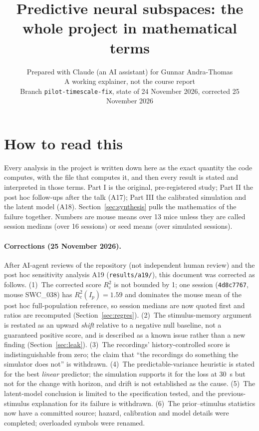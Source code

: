 \documentclass[11pt]{article}
\title{Predictive neural subspaces: the whole project in mathematical terms}
\author{Prepared with Claude (an AI assistant) for Gunnar Andra-Thomas \\ \small A working explainer, not the course report \\ \small Branch \texttt{pilot-timescale-fix}, state of 24 November 2026, corrected 25 November 2026}
\date{}
\newcommand{\Rc}{R^2_{\mathrm{c}}}
\begin{document}
\maketitle
\tableofcontents

\section*{How to read this}

Every analysis in the project is written down here as the exact quantity the code computes, with the file that
computes it, and then every result is stated and interpreted in those terms. Part I is the original, pre-registered
study; Part II the post hoc follow-ups after the talk (A17); Part III the calibrated simulation and the latent model
(A18). Section~\ref{sec:synthesis} pulls the mathematics of the failure together. Numbers are mouse means over 13
mice unless they are called session medians (over 16 sessions) or seed means (over simulated sessions).

\paragraph{Corrections (25 November 2026).} After AI-agent reviews of the repository (not independent human review)
and the post hoc sensitivity analysis A19 (\texttt{results/a19/}), this document was corrected as follows.
(1)~The corrected score $\Rc$ is not bounded by 1; one session (\texttt{4d8c7767}, mouse SWC\_038) has $\Rc(I_p) =
1.59$ and dominates the mouse mean of the post hoc full-population reference, so session medians are now quoted first
and ratios are recomputed (Section~\ref{sec:regres}). (2)~The stimulus-memory argument is restated as an upward
\emph{shift} relative to a negative null baseline, not a guaranteed positive score, and is described as a known
issue rather than a new finding (Section~\ref{sec:leak}). (3)~The recordings' history-controlled score is
indistinguishable from zero; the claim that ``the recordings do something the simulator does not'' is withdrawn.
(4)~The predictable-variance heuristic is stated for the best \emph{linear} predictor; the simulation supports it for
the loss at 30~s but not for the change with horizon, and drift is not established as the cause. (5)~The latent-model
conclusion is limited to the specification tested, and the previous-stimulus explanation for its failure is withdrawn.
(6)~The prior--stimulus statistics now have a committed source; hazard, calibration and model details were completed;
overloaded symbols were renamed.
\end{document}

